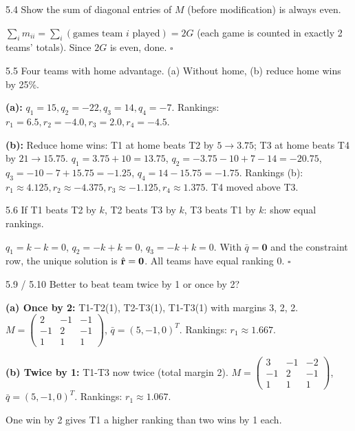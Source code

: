 \begin{exercise}{5.4}
Show the sum of diagonal entries of $M$ (before modification) is always even.
\end{exercise}
\begin{solution}
$\sum_i m_{ii}=\sum_i(\text{games team }i\text{ played})=2G$ (each game is counted in exactly 2 teams' totals). Since $2G$ is even, done. $\square$
\end{solution}

\begin{exercise}{5.5}
Four teams with home advantage. (a) Without home, (b) reduce home wins by 25\%.
\end{exercise}
\begin{solution}
\textbf{(a):} $q_1=15,q_2=-22,q_3=14,q_4=-7$. Rankings: $r_1=6.5,r_2=-4.0,r_3=2.0,r_4=-4.5$.

\textbf{(b):} Reduce home wins: T1 at home beats T2 by $5\to3.75$; T3 at home beats T4 by $21\to15.75$.
$q_1=3.75+10=13.75$, $q_2=-3.75-10+7-14=-20.75$, $q_3=-10-7+15.75=-1.25$, $q_4=14-15.75=-1.75$.
Rankings (b): $r_1\approx4.125,r_2\approx-4.375,r_3\approx-1.125,r_4\approx1.375$. T4 moved above T3.
\end{solution}

\begin{exercise}{5.6}
If T1 beats T2 by $k$, T2 beats T3 by $k$, T3 beats T1 by $k$: show equal rankings.
\end{exercise}
\begin{solution}
$q_1=k-k=0$, $q_2=-k+k=0$, $q_3=-k+k=0$. With $\bar{q}=\mathbf{0}$ and the constraint row, the unique solution is $\hat{\mathbf{r}}=\mathbf{0}$. All teams have equal ranking 0. $\square$
\end{solution}

\begin{exercise}{5.9 / 5.10}
Better to beat team twice by 1 or once by 2?
\end{exercise}
\begin{solution}
\textbf{(a) Once by 2:} T1-T2(1), T2-T3(1), T1-T3(1) with margins 3, 2, 2.
$M=\begin{pmatrix}2&-1&-1\\-1&2&-1\\1&1&1\end{pmatrix}$, $\bar{q}=(5,-1,0)^T$. Rankings: $r_1\approx1.667$.

\textbf{(b) Twice by 1:} T1-T3 now twice (total margin 2).
$M=\begin{pmatrix}3&-1&-2\\-1&2&-1\\1&1&1\end{pmatrix}$, $\bar{q}=(5,-1,0)^T$. Rankings: $r_1\approx1.067$.

One win by 2 gives T1 a higher ranking than two wins by 1 each.
\end{solution}

